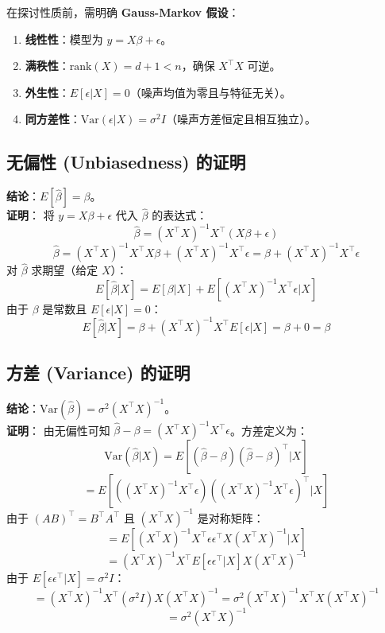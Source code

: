 \documentclass[12pt, a4paper]{article}
\begin{document}
在探讨性质前，需明确 \textbf{Gauss-Markov 假设}：
\begin{enumerate}
    \item \textbf{线性性}：模型为 $y = X\beta + \epsilon$。
    \item \textbf{满秩性}：$\text{rank}(X) = d+1 < n$，确保 $X^\top X$ 可逆。
    \item \textbf{外生性}：$E[\epsilon|X] = 0$（噪声均值为零且与特征无关）。
    \item \textbf{同方差性}：$\text{Var}(\epsilon|X) = \sigma^2 I$（噪声方差恒定且相互独立）。
\end{enumerate}

\subsection{无偏性 (Unbiasedness) 的证明}
\textbf{结论}：$E[\hat{\beta}] = \beta$。
\\ \textbf{证明}：
将 $y = X\beta + \epsilon$ 代入 $\hat{\beta}$ 的表达式：
$$ \hat{\beta} = (X^\top X)^{-1} X^\top (X\beta + \epsilon) $$
$$ \hat{\beta} = (X^\top X)^{-1} X^\top X \beta + (X^\top X)^{-1} X^\top \epsilon = \beta + (X^\top X)^{-1} X^\top \epsilon $$
对 $\hat{\beta}$ 求期望（给定 $X$）：
$$ E[\hat{\beta}|X] = E[\beta|X] + E[(X^\top X)^{-1} X^\top \epsilon | X] $$
由于 $\beta$ 是常数且 $E[\epsilon|X] = 0$：
$$ E[\hat{\beta}|X] = \beta + (X^\top X)^{-1} X^\top E[\epsilon|X] = \beta + 0 = \beta $$

\subsection{方差 (Variance) 的证明}
\textbf{结论}：$\text{Var}(\hat{\beta}) = \sigma^2 (X^\top X)^{-1}$。
\\ \textbf{证明}：
由无偏性可知 $\hat{\beta} - \beta = (X^\top X)^{-1} X^\top \epsilon$。方差定义为：
$$ \text{Var}(\hat{\beta}|X) = E[(\hat{\beta}-\beta)(\hat{\beta}-\beta)^\top | X] $$
$$ = E[((X^\top X)^{-1} X^\top \epsilon) ((X^\top X)^{-1} X^\top \epsilon)^\top | X] $$
由于 $(AB)^\top = B^\top A^\top$ 且 $(X^\top X)^{-1}$ 是对称矩阵：
$$ = E[(X^\top X)^{-1} X^\top \epsilon \epsilon^\top X (X^\top X)^{-1} | X] $$
$$ = (X^\top X)^{-1} X^\top E[\epsilon \epsilon^\top | X] X (X^\top X)^{-1} $$
由于 $E[\epsilon \epsilon^\top | X] = \sigma^2 I$：
$$ = (X^\top X)^{-1} X^\top (\sigma^2 I) X (X^\top X)^{-1} = \sigma^2 (X^\top X)^{-1} X^\top X (X^\top X)^{-1} $$
$$ = \sigma^2 (X^\top X)^{-1} $$
\end{document}

